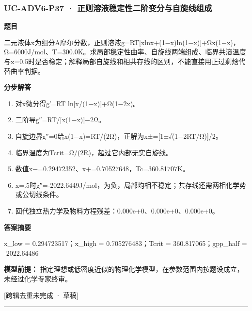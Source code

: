 \documentclass[UTF8,11pt,a4paper]{ctexart}
\begin{document}
\subsubsection*{UC-ADV6-P37 · 正则溶液稳定性二阶变分与自旋线组成}
\noindent\textbf{题目}\par
二元液体x为组分A摩尔分数，正则溶液g=RT[xlnx+(1−x)ln(1−x)]+Ωx(1−x)，Ω=6000J/mol、T=300.0K。求局部稳定性曲率、自旋线两端组成、临界共溶温度与x=0.5时是否稳定；解释局部自旋线和相共存线的区别，不能直接用正过剩焓代替曲率判据。\par
\medskip\noindent\textbf{分步解答}
\begin{enumerate}
\item 对x微分得g′=RT ln[x/(1−x)]+Ω(1−2x)。
\item 二阶导g″=RT/[x(1−x)]−2Ω。
\item 自旋边界g″=0给x(1−x)=RT/(2Ω)，正解为x±=[1±√(1−2RT/Ω)]/2。
\item 临界温度为Tcrit=Ω/(2R)，超过它内部无实自旋线。
\item 数值x−=0.29472352、x+=0.70527648，Tc=360.81707K。
\item x=.5时g″=-2022.6449J/mol，为负，局部均相不稳定；共存线还需两相化学势或公切线条件。
\item 回代独立热力学及物料方程残差：0.000e+0、0.000e+0、0.000e+0。
\end{enumerate}
\noindent\textbf{答案摘要}\par
x\_low = 0.294723517；x\_high = 0.705276483；Tcrit = 360.817065；gpp\_half = -2022.64486\par
\noindent\textbf{模型前提：}
指定理想或低密度近似的物理化学模型，在参数范围内按题设成立，未经过化学专家终审。\par
\noindent\textcolor{red!65!black}{[跨辑去重未完成 · 草稿]} \par
\medskip\hrule\medskip
{}
\end{document}
